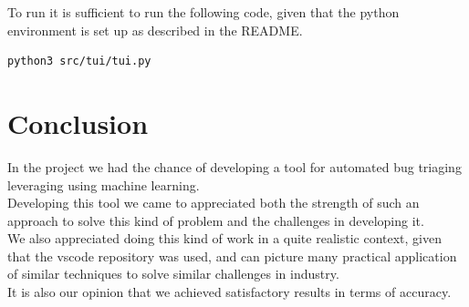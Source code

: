 \documentclass[tikz,10pt,fleqn]{article}
\begin{document}
To run it is sufficient to run the following code, given that the python environment is set up as described in the README.
\begin{verbatim}
python3 src/tui/tui.py
\end{verbatim}

\section*{Conclusion}
In the project we had the chance of developing a tool for automated bug triaging leveraging using machine learning.\\
Developing this tool we came to appreciated both the strength of such an approach to solve this kind of problem and the challenges in developing it.\\
We also appreciated doing this kind of work in a quite realistic context, given that the vscode repository was used, and can picture many practical application of similar techniques to solve similar challenges in industry.\\
It is also our opinion that we achieved satisfactory results in terms of accuracy.
\end{document}
